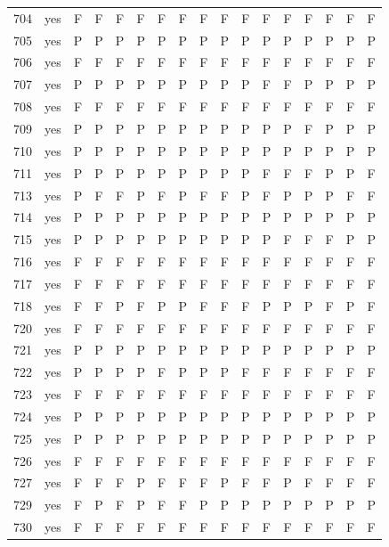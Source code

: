 \begin{table}[p]
\begin{tabular*}{\textwidth}{@{\extracolsep{\fill}}rcccccccccccccccc}
704 & yes & F & F & F & F & F & F & F & F & F & F & F & F & F & F & F\\
705 & yes & P & P & P & P & P & P & P & P & P & P & P & P & P & P & P\\
706 & yes & F & F & F & F & F & F & F & F & F & F & F & F & F & F & F\\
707 & yes & P & P & P & P & P & P & P & P & P & F & F & P & P & P & P\\
708 & yes & F & F & F & F & F & F & F & F & F & F & F & F & F & F & F\\
709 & yes & P & P & P & P & P & P & P & P & P & P & P & F & P & P & P\\
710 & yes & P & P & P & P & P & P & P & P & P & P & P & P & P & P & P\\
711 & yes & P & P & P & P & P & P & P & P & P & F & F & F & P & P & F\\
713 & yes & P & F & F & P & F & P & F & F & P & F & P & P & P & F & F\\
714 & yes & P & P & P & P & P & P & P & P & P & P & P & P & P & P & P\\
715 & yes & P & P & P & P & P & P & P & P & P & P & F & F & F & P & P\\
716 & yes & F & F & F & F & F & F & F & F & F & F & F & F & F & F & F\\
717 & yes & F & F & F & F & F & F & F & F & F & F & F & F & F & F & F\\
718 & yes & F & F & P & F & P & P & F & F & F & P & P & P & F & P & F\\
720 & yes & F & F & F & F & F & F & F & F & F & F & F & F & F & F & F\\
721 & yes & P & P & P & P & P & P & P & P & P & P & P & P & P & P & P\\
722 & yes & P & P & P & P & F & P & P & P & F & F & F & F & F & F & F\\
723 & yes & F & F & F & F & F & F & F & F & F & F & F & F & F & F & F\\
724 & yes & P & P & P & P & P & P & P & P & P & P & P & P & P & P & P\\
725 & yes & P & P & P & P & P & P & P & P & P & P & P & P & P & P & P\\
726 & yes & F & F & F & F & F & F & F & F & F & F & F & F & F & F & F\\
727 & yes & F & F & F & P & F & F & F & P & F & F & P & F & F & F & F\\
729 & yes & F & P & F & P & F & F & P & P & P & P & P & P & P & P & P\\
730 & yes & F & F & F & F & F & F & F & F & F & F & F & F & F & F & F\\
\bottomrule\end{tabular*}\end{table}
\clearpage


